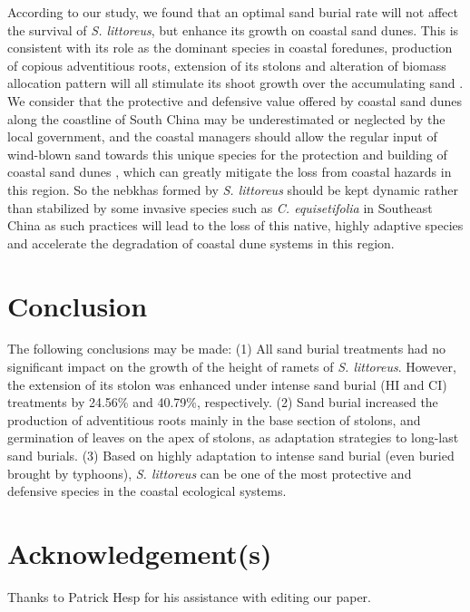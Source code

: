 \documentclass[]{interact}
\theoremstyle{plain}%
\theoremstyle{definition}
\theoremstyle{remark}
\begin{document}
According to our study, we found that an optimal sand burial rate will not affect the survival of \textit{S. littoreus}, but enhance its growth on coastal sand dunes. This is consistent with its role as the dominant species in coastal foredunes, production of copious adventitious roots, extension of its stolons and alteration of biomass allocation pattern will all stimulate its shoot growth over the accumulating sand \citep{dechAdventitiousRootProduction2006}. 
We consider that the protective and defensive value offered by coastal sand dunes along the coastline of South China may be underestimated or neglected by the local government, and the coastal managers should allow the regular input of wind-blown sand towards this unique species for the protection and building of coastal sand dunes \citep{noletUAVimagingModelGrowth2018}, which can greatly mitigate the loss from coastal hazards in this region. So the nebkhas formed by \textit{S. littoreus} should be kept dynamic rather than stabilized by some invasive species such as \textit{C. equisetifolia} in Southeast China as such practices will lead to the loss of this native, highly adaptive species and accelerate the degradation of coastal dune systems in this region. 

\section{Conclusion}
The following conclusions may be made:
(1) All sand burial treatments had no significant impact on the growth of the height of ramets of \textit{S. littoreus}. However, the extension of its stolon was enhanced under intense sand burial (HI and CI) treatments by 24.56\% and 40.79\%, respectively.
(2) Sand burial increased the production of adventitious roots mainly in the base section of stolons, and germination of leaves on the apex of stolons, as adaptation strategies to long-last sand burials. 
(3) Based on highly adaptation to intense sand burial (even buried brought by typhoons), \textit{S. littoreus} can be one of the most protective and defensive species in the coastal ecological systems.

\section*{Acknowledgement(s)}

Thanks to Patrick Hesp for his assistance with editing our paper.
\end{document}
